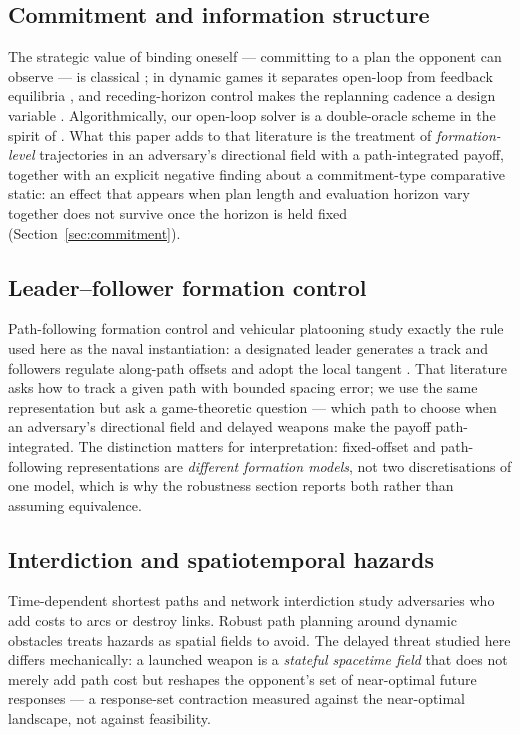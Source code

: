 \documentclass[12pt,a4paper]{article}
\begin{document}
\subsection{Commitment and information structure}
The strategic value of binding oneself --- committing to a plan the
opponent can observe --- is classical \cite{schelling1960}; in dynamic
games it separates open-loop from feedback equilibria \cite{basar1999},
and receding-horizon control makes the replanning cadence a design
variable \cite{mayne2000}.  Algorithmically, our open-loop solver is a
double-oracle scheme in the spirit of \cite{mcmahan2003}.  What this paper
adds to that literature is the treatment of \emph{formation-level}
trajectories in an adversary's directional field with a path-integrated
payoff, together with an explicit negative finding about a commitment-type
comparative static: an effect that appears when plan length and evaluation
horizon vary together does not survive once the horizon is held fixed
(Section~\ref{sec:commitment}).

\subsection{Leader--follower formation control}
Path-following formation control and vehicular platooning study exactly the
rule used here as the naval instantiation: a designated leader generates a
track and followers regulate along-path offsets and adopt the local tangent
\cite{skjetne2005, dunbar2006}.  That literature asks how to track a given
path with bounded spacing error; we use the same representation but ask a
game-theoretic question --- which path to choose when an adversary's
directional field and delayed weapons make the payoff path-integrated.  The
distinction matters for interpretation: fixed-offset and path-following
representations are \emph{different formation models}, not two
discretisations of one model, which is why the robustness section reports
both rather than assuming equivalence.

\subsection{Interdiction and spatiotemporal hazards}
Time-dependent shortest paths \cite{orda1990} and network interdiction
\cite{israeli2002} study adversaries who add costs to arcs or destroy
links.  Robust path planning around dynamic obstacles treats hazards as
spatial fields to avoid.  The delayed threat studied here differs
mechanically: a launched weapon is a \emph{stateful spacetime field} that
does not merely add path cost but reshapes the opponent's set of
near-optimal future responses --- a response-set contraction measured
against the near-optimal landscape, not against feasibility.
\end{document}
